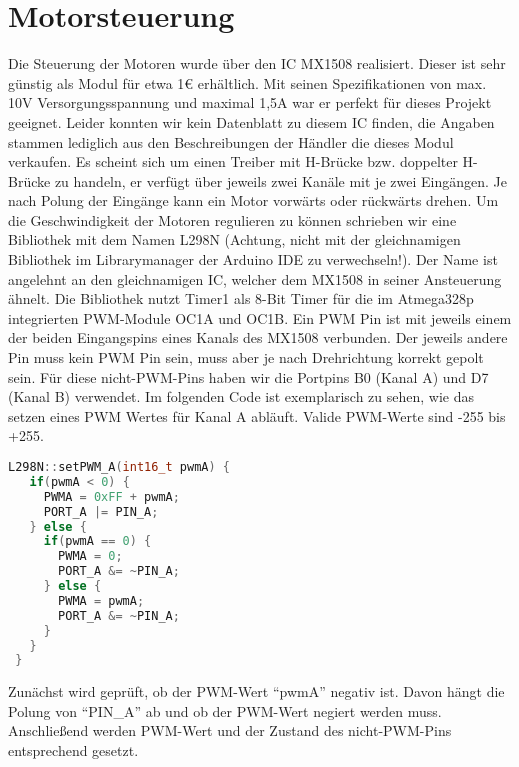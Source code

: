 \documentclass[12pt]{article}
\begin{document}
\newpage
\section{Motorsteuerung} %

Die Steuerung der Motoren wurde über den IC MX1508 realisiert. Dieser ist sehr günstig als Modul für etwa 1€ erhältlich.
Mit seinen Spezifikationen von max. 10V Versorgungsspannung und maximal 1,5A war er perfekt für dieses Projekt geeignet.
Leider konnten wir kein Datenblatt zu diesem IC finden, die Angaben stammen lediglich aus den Beschreibungen der Händler die dieses Modul verkaufen.
Es scheint sich um einen Treiber mit H-Brücke bzw. doppelter H-Brücke zu handeln, er verfügt über jeweils zwei Kanäle mit je zwei Eingängen. Je nach Polung der Eingänge kann ein Motor vorwärts oder rückwärts drehen.
Um die Geschwindigkeit der Motoren regulieren zu können schrieben wir eine Bibliothek mit dem Namen L298N (Achtung, nicht mit der gleichnamigen Bibliothek im Librarymanager der Arduino IDE zu verwechseln!).
Der Name ist angelehnt an den gleichnamigen IC, welcher dem MX1508 in seiner Ansteuerung ähnelt.
Die Bibliothek nutzt Timer1 als 8-Bit Timer für die im Atmega328p integrierten PWM-Module OC1A und OC1B.
Ein PWM Pin ist mit jeweils einem der beiden Eingangspins eines Kanals des MX1508 verbunden. Der jeweils andere Pin muss kein PWM Pin sein, muss aber je nach Drehrichtung korrekt gepolt sein. Für diese nicht-PWM-Pins haben wir die Portpins B0 (Kanal A) und D7 (Kanal B) verwendet.
\newline
Im folgenden Code ist exemplarisch zu sehen, wie das setzen eines PWM Wertes für Kanal A abläuft. Valide PWM-Werte sind -255 bis +255.


\begin{file}[MX1508]
        \begin{lstlisting}[language=C++]
 L298N::setPWM_A(int16_t pwmA) {
   if(pwmA < 0) {
     PWMA = 0xFF + pwmA;
     PORT_A |= PIN_A;
   } else {
     if(pwmA == 0) {
       PWMA = 0;
       PORT_A &= ~PIN_A;
     } else {
       PWMA = pwmA;
       PORT_A &= ~PIN_A;
     }
   }
 }
        \end{lstlisting}
\end{file}

Zunächst wird geprüft, ob der PWM-Wert "`pwmA"'  negativ ist. Davon hängt die Polung von "`PIN\_A"' ab und ob der PWM-Wert negiert werden muss.
\newline
Anschließend werden PWM-Wert und der Zustand des nicht-PWM-Pins entsprechend gesetzt.
\end{document}

